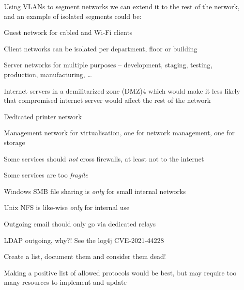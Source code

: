 \documentclass[Screen16to9,17pt]{foils}
\begin{document}
Using VLANs to segment networks we can extend it to the rest of the network, and an example of isolated segments could be:
\begin{list2}
\item Guest network for cabled and Wi-Fi clients
\item Client networks can be isolated per department, floor or building
\item Server networks for multiple purposes – development, staging, testing, production, manufacturing, …
\item Internet servers in a demilitarized zone (DMZ)4 which would make it less likely that compromised internet
server would affect the rest of the network
\item Dedicated printer network
\item Management network for virtualisation, one for network management, one for storage
\end{list2}




\begin{list1}
\item Some services should \emph{not} cross firewalls, at least not to the internet
\item Some services are too \emph{fragile}

\begin{list2}
\item Windows SMB file sharing is \emph{only} for small internal networks
\item Unix NFS is like-wise \emph{only} for internal use
\item Outgoing email should only go via dedicated relays
\item LDAP outgoing, why?! See the log4j CVE-2021-44228
\item Create a list, document them and consider them dead!
\end{list2}
\item Making a positive list of allowed protocols would be best, but may require too many resources to implement and update
\end{list1}


\end{document}
